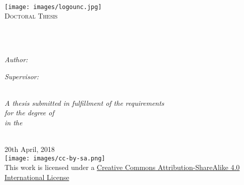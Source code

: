 \documentclass[
11pt, %
english, %
onehalfspacing, %
nolistspacing, %
headsepline, %
consistentlayout, %
]{MastersDoctoralThesis} %
\author{Cristian \textsc{Cardellino}} %
\begin{document}
\frontmatter %

\pagestyle{plain} %


\begin{titlepage}
\begin{center}

{\scshape\LARGE \univname\\\facname\par}\vspace{0.5cm} %
\texttt{[image: images/logounc.jpg]}\\[0.4cm] %
\textsc{\Large Doctoral Thesis}\\[0.2cm] %

\HRule \\[0.4cm] %
{\huge \bfseries \ttitle\par}\vspace{0.4cm} %
\HRule \\[1cm] %
 
\begin{minipage}[t]{0.4\textwidth}
\begin{flushleft} \large
\emph{Author:}\\
\href{https://crscardellino.github.io}{\authorname} %
\end{flushleft}
\end{minipage}
\begin{minipage}[t]{0.4\textwidth}
\begin{flushright} \large
\emph{Supervisor:} \\
\href{https://cs.famaf.unc.edu.ar/~laura/}{\supname} %
\end{flushright}
\end{minipage}\\[1cm]

\large \textit{A thesis submitted in fulfillment of the requirements\\ for the degree of \degreename}\\[0.2cm] %
\textit{in the}\\[0.2cm]
\groupname\\\deptname

{\large 20th April, 2018}\\[0.5cm] %

\texttt{[image: images/cc-by-sa.png]}\\
{\small This work is licensed under a 
\href{http://creativecommons.org/licenses/by-sa/4.0/}
	{Creative Commons Attribution-ShareAlike 4.0 International License}}
 
\vfill
\end{center}
\end{titlepage}
\end{document}
